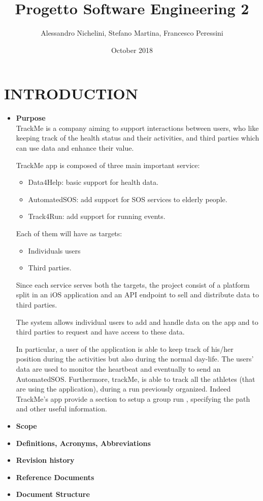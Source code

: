\documentclass{article}
\title{Progetto Software Engineering 2}
\author{Alessandro Nichelini, Stefano Martina, Francesco Peressini}
\date{October 2018}
\begin{document}
\maketitle

\section{INTRODUCTION}
\begin{itemize}
\item \textbf{Purpose}\\
TrackMe is a company aiming to support interactions between users, who like keeping track of the health status and their activities, and third parties which can use data and enhance their value.

TrackMe app is composed of three main important service:
\begin{itemize}
\item Data4Help: basic support for health data.
\item AutomatedSOS: add support for SOS services to elderly people. 
\item Track4Run: add support for running events.
\end{itemize}

Each of them will have as targets:
\begin{itemize}
\item Individuals users
\item Third parties.
\end{itemize}
Since each service serves both the targets, the project consist of a platform split in an iOS application and an API endpoint to sell and distribute data to third parties.

The system allows individual users to add and handle data on the app and to third parties to request and have access to these data.

In particular, a user of the application is able to keep track of his/her position during the activities but also during the normal day-life. The users’ data are used to monitor the heartbeat and eventually to send an AutomatedSOS.
Furthermore, trackMe, is able to track all the athletes (that are using the application), during a run previously organized. Indeed TrackMe’s app provide a section to setup a group run , specifying the path and other useful information.

\item \textbf{Scope}


\item \textbf{Definitions, Acronyms, Abbreviations}
\item \textbf{Revision history}
\item \textbf{Reference Documents}
\item \textbf{Document Structure}
\end{itemize}
\end{document}
